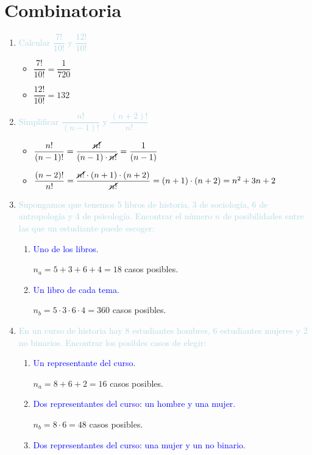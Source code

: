 \documentclass{article}
\newcommand{\lb}[1]{\textcolor{lightblue}{#1}}
\newcommand{\db}[1]{\textcolor{blue}{#1}}
\begin{document}
\section{Combinatoria}
\begin{enumerate}[label=\color{red}\textbf{\arabic*)}, leftmargin=*]
	\item \lb{Calcular $\dfrac{7!}{10!}$ y $\dfrac{12!}{10!}$}
    \begin{itemize}[label=$-$]
    \item $\dfrac{7!}{10!}=\dfrac{1}{720}$
    \item $\dfrac{12!}{10!}=132$
    \end{itemize}
    \item \lb{Simplificar $\dfrac{n!}{(n-1)!}$ y $\dfrac{(n+2)!}{n!}$}
    \begin{itemize}[label=$-$]
    \item $\dfrac{n!}{(n-1)!}=\dfrac{\cancel{n!}}{(n-1)\cdot\cancel{n!}}=\dfrac{1}{(n-1)}$
    \item $\dfrac{(n-2)!}{n!}=\dfrac{\cancel{n!}\cdot(n+1)\cdot(n+2)}{\cancel{n!}}=(n+1)\cdot(n+2)=n^2+3n+2$
    \end{itemize}
    \item \lb{Supongamos que tenemos 5 libros de historia, 3 de sociología, 6 de antropología y 4 de psicología. Encontrar el número $n$ de posibilidades entre las que un estudiante puede escoger:}
    \begin{enumerate}[label=\color{red}\alph*)]
    	\item \db{Uno de los libros.}
        
        $n_a=5+3+6+4=18$ casos posibles.
        \item \db{Un libro de cada tema.}
        
        $n_b=5\cdot3\cdot6\cdot4=360$ casos posibles.
    \end{enumerate}
    \item \lb{En un curso de historia hay 8 estudiantes hombres, 6 estudiantes mujeres y 2 no binarios. Encontrar los posibles casos de elegir:}
    \begin{enumerate}[label=\color{red}\alph*)]
    	\item \db{Un representante del curso.}
        
        $n_a=8+6+2=16$ casos posibles.
        \item \db{Dos representantes del curso: un hombre y una mujer.}
        
        $n_b=8\cdot6=48$ casos posibles.
        \item \db{Dos representantes del curso: una mujer y un no binario.}
        

\end{enumerate}
\end{enumerate}
\end{document}
